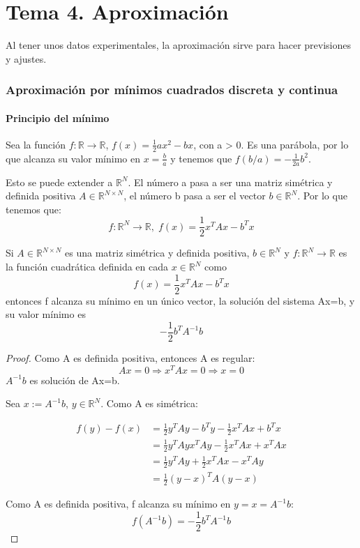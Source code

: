 \part{Tema 4. Aproximación}
Al tener unos datos experimentales, la aproximación sirve para hacer previsiones y ajustes.

\section{Aproximación por mínimos cuadrados discreta y continua}

\subsection{Principio del mínimo}
Sea la función $f: \mathbb{R} \longrightarrow \mathbb{R}$, $f(x)=\frac{1}{2}ax^2-bx$, con a > 0. Es una parábola, por lo que alcanza su valor mínimo en $x = \frac{b}{a}$ y tenemos que $f(b/a) = - \frac{1}{2a}b^2$.

Esto se puede extender a $\mathbb{R}^N$. El número a pasa a ser una matriz simétrica y definida positiva $A \in \mathbb{R}^{N \times N}$, el número b pasa a ser el vector $b \in \mathbb{R}^N$. Por lo que tenemos que:
\[ f: \mathbb{R}^N \longrightarrow \mathbb{R}, \; f(x) = \frac{1}{2}x^TAx-b^Tx \]

\begin{nth}
Si $A \in \mathbb{R}^{N \times N}$ es una matriz simétrica y definida positiva, $b \in \mathbb{R}^N$ y $f: \mathbb{R}^N \longrightarrow \mathbb{R}$ es la función cuadrática definida en cada $x \in \mathbb{R}^N$ como
\[ f(x) = \frac{1}{2}x^TAx-b^Tx \]
entonces f alcanza su mínimo en un único vector, la solución del sistema Ax=b, y su valor mínimo es
\[ - \frac{1}{2}b^TA^{-1}b \]
\end{nth}

\begin{proof}
Como A es definida positiva, entonces A es regular:
\[ Ax=0 \Rightarrow x^TAx=0 \Rightarrow x=0 \]
$A^{-1}b$ es solución de Ax=b.

Sea $x:=A^{-1}b$, $y \in \mathbb{R}^N$. Como A es simétrica:

	\begin{equation*}
		\begin{split}
		f(y) - f(x) & = \frac{1}{2} y^TAy - b^Ty - \frac{1}{2}x^TAx + b^Tx \\
		& = \frac{1}{2}y^TAy  x^TAy - \frac{1}{2}x^TAx + x^TAx \\
		& = \frac{1}{2}y^TAy + \frac{1}{2}x^TAx - x^TAy \\
		& = \frac{1}{2}(y-x)^TA(y-x)
		\end{split}
	\end{equation*}
	
Como A es definida positiva, f alcanza su mínimo en $y=x=A^{-1}b$:
\[ f(A^{-1}b) = -\frac{1}{2}b^TA^{-1}b \]
	
\end{proof}

